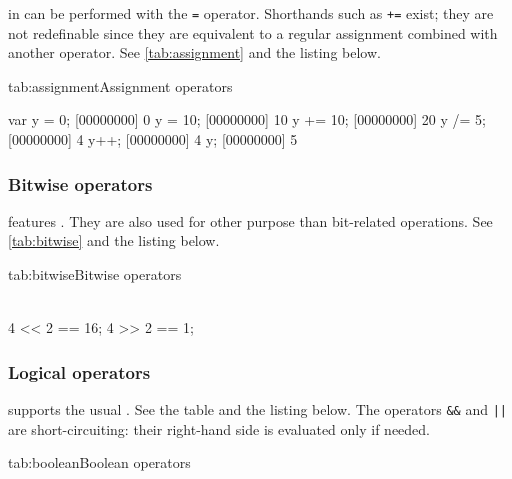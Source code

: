  in \us can be performed with the \lstinline|=|
operator.  Shorthands such as \lstinline|+=| exist; they are not
redefinable since they are equivalent to a regular assignment combined
with another operator. See \autoref{tab:assignment} and the listing
below.


\begin{operatorTable}{tab:assignment}{Assignment operators}
  \operatorass[\footnotemark]\\
  \operatorsiass
\end{operatorTable}



\begin{urbiscript}
var y = 0;
[00000000] 0
y = 10;
[00000000] 10
y += 10;
[00000000] 20
y /= 5;
[00000000] 4
y++;
[00000000] 4
y;
[00000000] 5
\end{urbiscript}

\subsubsection{Bitwise operators}

\us features .  They are also used for other
purpose than bit-related operations. See \autoref{tab:bitwise} and the
listing below.

\begin{operatorTable}{tab:bitwise}{Bitwise operators}
  \operatorlshift\\
  \operatorrshift\\
  \hline
  \operatorbxor
\end{operatorTable}

\begin{urbiassert}
4 << 2 == 16;
4 >> 2 ==  1;
\end{urbiassert}

\subsubsection{Logical operators}

\us supports the usual . See the table and the
listing below. The operators \lstinline|&&| and \lstinline-||- are
short-circuiting: their right-hand side is evaluated only if needed.

\begin{operatorTable}{tab:boolean}{Boolean operators}
  \operatorneg\\
  \hline
  \operatorand\\
  \hline
  \operatoror
\end{operatorTable}

